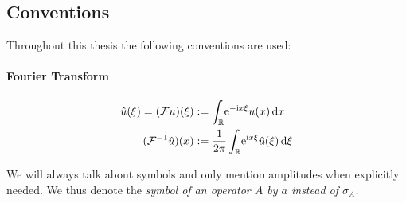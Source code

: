 \subsection{Conventions}
Throughout this thesis the following conventions are used:
\paragraph{Fourier Transform}
\begin{align*}
  \hat{u}(\xi) = (\mathcal{F}u)(\xi)
    &:= \Integ{\mathbb{R}}{x}{\Eto{-\mathrm ix\xi} u(x)} \\
  (\mathcal{F}^{-1}\hat{u})(x) &:=
  \frac{1}{2\pi}\Integ{\mathbb{R}}{\xi}{\Eto{\mathrm ix\xi}
    \hat{u}(\xi)}
\end{align*}

We will always talk about symbols and only mention amplitudes when explicitly
needed. We thus denote the \em{symbol} of an operator $A$ by $a$ instead of
$\sigma_A$.
